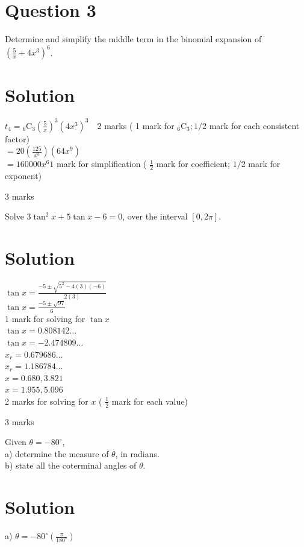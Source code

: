 \documentclass[10pt]{article}
\begin{document}
\section*{Question 3}
Determine and simplify the middle term in the binomial expansion of $\left(\frac{5}{x}+4 x^{3}\right)^{6}$.

\section*{Solution}
$t_{4}={ }_{6} \mathrm{C}_{3}\left(\frac{5}{x}\right)^{3}\left(4 x^{3}\right)^{3} \quad 2$ marks ( 1 mark for ${ }_{6} \mathrm{C}_{3} ; 1 / 2$ mark for each consistent factor)\\
$=20\left(\frac{125}{x^{3}}\right)\left(64 x^{9}\right)$\\
$=160000 x^{6} 1$ mark for simplification ( $\frac{1}{2}$ mark for coefficient; $1 / 2$ mark for exponent)

3 marks

Solve $3 \tan ^{2} x+5 \tan x-6=0$, over the interval $[0,2 \pi]$.

\section*{Solution}
$\tan x=\frac{-5 \pm \sqrt{5^{2}-4(3)(-6)}}{2(3)}$\\
$\tan x=\frac{-5 \pm \sqrt{97}}{6}$\\
1 mark for solving for $\tan x$\\
$\tan x=0.808142 \ldots$\\
$\tan x=-2.474809 \ldots$\\
$x_{r}=0.679686 \ldots$\\
$x_{r}=1.186784 \ldots$\\
$x=0.680,3.821$\\
$x=1.955,5.096$\\
2 marks for solving for $x$ ( $\frac{1}{2}$ mark for each value)

3 marks

Given $\theta=-80^{\circ}$,\\
a) determine the measure of $\theta$, in radians.\\
b) state all the coterminal angles of $\theta$.

\section*{Solution}
a) $\theta=-80^{\circ}\left(\frac{\pi}{180^{\circ}}\right)$
\end{document}
